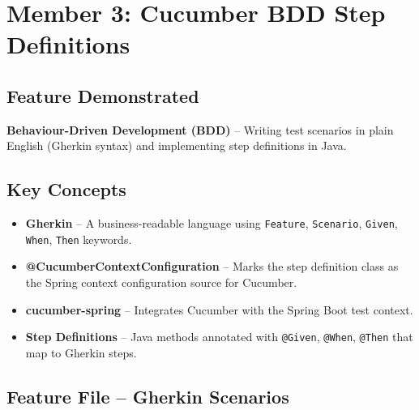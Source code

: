 \documentclass[12pt,a4paper]{article}
\begin{document}
\section{Member 3: Cucumber BDD Step Definitions}
\label{sec:member3}

\subsection{Feature Demonstrated}
\textbf{Behaviour-Driven Development (BDD)} -- Writing test scenarios in plain English (Gherkin syntax) and implementing step definitions in Java.

\subsection{Key Concepts}
\begin{itemize}
    \item \textbf{Gherkin} -- A business-readable language using \texttt{Feature}, \texttt{Scenario}, \texttt{Given}, \texttt{When}, \texttt{Then} keywords.
    \item \textbf{@CucumberContextConfiguration} -- Marks the step definition class as the Spring context configuration source for Cucumber.
    \item \textbf{cucumber-spring} -- Integrates Cucumber with the Spring Boot test context.
    \item \textbf{Step Definitions} -- Java methods annotated with \texttt{@Given}, \texttt{@When}, \texttt{@Then} that map to Gherkin steps.
\end{itemize}

\subsection{Feature File -- Gherkin Scenarios}
\end{document}
